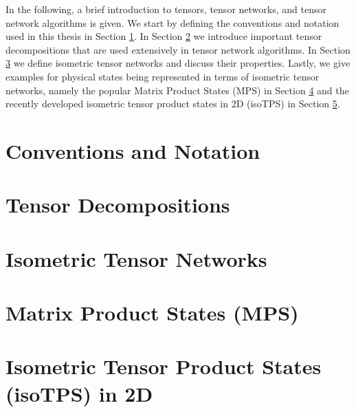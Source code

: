 In the following, a brief introduction to tensors, tensor networks, and tensor network algorithms is given. We start by defining the conventions and notation used in this thesis in Section \ref{sec:tensors_and_tensor_networks_conventions_and_notation}. In Section \ref{sec:tensors_and_tensor_networks_tensor_decompositions} we introduce important tensor decompositions that are used extensively in tensor network algorithms. In Section \ref{sec:tensors_and_tensor_networks_isometric_tensor_networks} we define isometric tensor networks and discuss their properties. Lastly, we give examples for physical states being represented in terms of isometric tensor networks, namely the popular Matrix Product States (MPS) in Section \ref{sec:tensors_and_tensor_networks_matrix_product_states} and the recently developed isometric tensor product states in 2D (isoTPS) in Section \ref{sec:tensors_and_tensor_networks_isometric_tensor_product_states_in_2D}.

\section{Conventions and Notation}
\label{sec:tensors_and_tensor_networks_conventions_and_notation}


\newpage
\section{Tensor Decompositions}
\label{sec:tensors_and_tensor_networks_tensor_decompositions}


\section{Isometric Tensor Networks}
\label{sec:tensors_and_tensor_networks_isometric_tensor_networks}


\newpage
\section{Matrix Product States (MPS)}
\label{sec:tensors_and_tensor_networks_matrix_product_states}


\section{Isometric Tensor Product States (isoTPS) in 2D}
\label{sec:tensors_and_tensor_networks_isometric_tensor_product_states_in_2D}
